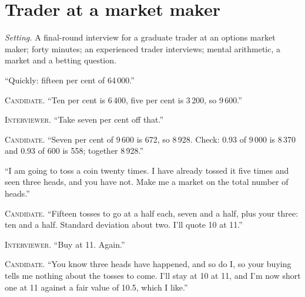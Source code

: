 \section{Trader at a market maker}

\emph{Setting.} A final-round interview for a graduate trader at an options market maker; forty minutes; an experienced trader
interviews; mental arithmetic, a market and a betting question.

\begin{interviewq}\label{iq:iv:mock-interviews:1}
``Quickly: fifteen per cent of 64\,000.''
\end{interviewq}

\noindent\textsc{Candidate.} ``Ten per cent is 6\,400, five per cent is 3\,200, so 9\,600.''


\noindent\textsc{Interviewer.} ``Take seven per cent off that.''

\noindent\textsc{Candidate.} ``Seven per cent of 9\,600 is 672, so 8\,928. Check: 0.93 of 9\,000 is 8\,370 and 0.93 of 600 is 558;
together 8\,928.''


\begin{interviewq}\label{iq:iv:mock-interviews:2}
``I am going to toss a coin twenty times. I have already tossed it five times and seen three heads, and you have not. Make me a
market on the total number of heads.''
\end{interviewq}

\noindent\textsc{Candidate.} ``Fifteen tosses to go at a half each, seven and a half, plus your three: ten and a half. Standard
deviation about two. I'll quote 10 at 11.''

\noindent\textsc{Interviewer.} ``Buy at 11. Again.''

\noindent\textsc{Candidate.} ``You know three heads have happened, and so do I, so your buying tells me nothing about the tosses to
come. I'll stay at 10 at 11, and I'm now short one at 11 against a fair value of 10.5, which I like.''


